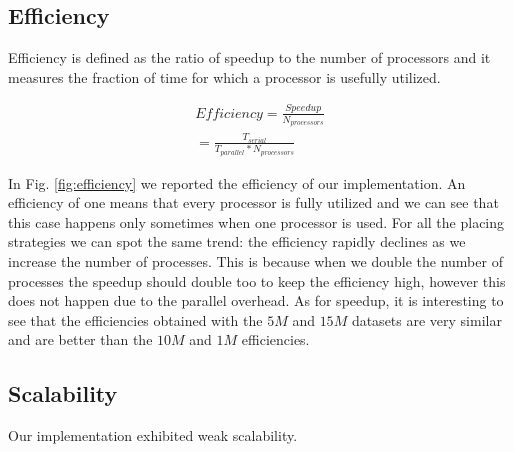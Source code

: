 \subsection{Efficiency}
Efficiency is defined as the ratio of speedup to the
number of processors and it measures the fraction of
time for which a processor is usefully utilized.

\begin{equation}
  \begin{split}
    Efficiency = \frac{Speedup}{N_{processors}} \\
    = \frac{T_{serial}}{T_{parallel} * N_{processors}}
  \end{split}
\end{equation}

In Fig. \ref{fig:efficiency} we reported the efficiency of our implementation.
An efficiency of one means that every processor is fully utilized and we can see that
this case happens only sometimes when one processor is used.
For all the placing strategies we can spot the same trend: the efficiency rapidly declines as we
increase the number of processes. This is because when we double the number of processes the speedup should
double too to keep the efficiency high, however this does not happen due to the parallel overhead.
As for speedup, it is interesting to see that the efficiencies obtained with the $5M$ and $15M$ datasets are very similar and are
better than the $10M$ and $1M$ efficiencies.

\subsection{Scalability}
Our implementation exhibited weak scalability.

